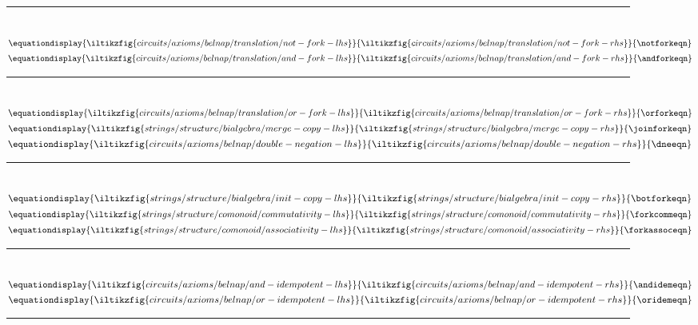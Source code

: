 \begin{figure*}
    \rule{\textwidth}{0.1mm}
    \\[0.5em]
    \(\equationdisplay{
        \iltikzfig{circuits/axioms/belnap/translation/not-fork-lhs}
    }{
        \iltikzfig{circuits/axioms/belnap/translation/not-fork-rhs}
    }{
        \notforkeqn
    }\)
    \quad
    \(\equationdisplay{
        \iltikzfig{circuits/axioms/belnap/translation/and-fork-lhs}
    }{
        \iltikzfig{circuits/axioms/belnap/translation/and-fork-rhs}
    }{
        \andforkeqn
    }\)
    \\[0.25em]
    \rule{\textwidth}{0.1mm}
    \\[0.5em]
    \(\equationdisplay{
        \iltikzfig{circuits/axioms/belnap/translation/or-fork-lhs}
    }{
        \iltikzfig{circuits/axioms/belnap/translation/or-fork-rhs}
    }{
        \orforkeqn
    }\)
    \quad
    \(\equationdisplay{
        \iltikzfig{strings/structure/bialgebra/merge-copy-lhs}
    }{
        \iltikzfig{strings/structure/bialgebra/merge-copy-rhs}
    }{
        \joinforkeqn
    }\)
    \quad
    \(\equationdisplay{
        \iltikzfig{circuits/axioms/belnap/double-negation-lhs}
    }{
        \iltikzfig{circuits/axioms/belnap/double-negation-rhs}
    }{
        \dneeqn
    }\)
    \\[0.25em]
    \rule{\textwidth}{0.1mm}
    \\[0.5em]
    \(\equationdisplay{
        \iltikzfig{strings/structure/bialgebra/init-copy-lhs}
    }{
        \iltikzfig{strings/structure/bialgebra/init-copy-rhs}
    }{
        \botforkeqn
    }\)
    \quad
    \(\equationdisplay{
        \iltikzfig{strings/structure/comonoid/commutativity-lhs}
    }{
        \iltikzfig{strings/structure/comonoid/commutativity-rhs}
    }{
        \forkcommeqn
    }\)
    \quad
    \(\equationdisplay{
        \iltikzfig{strings/structure/comonoid/associativity-lhs}
    }{
        \iltikzfig{strings/structure/comonoid/associativity-rhs}
    }{
        \forkassoceqn
    }\)
    \\[0.25em]
    \rule{\textwidth}{0.1mm}
    \\[0.5em]
    \(\equationdisplay{
        \iltikzfig{circuits/axioms/belnap/and-idempotent-lhs}
    }{
        \iltikzfig{circuits/axioms/belnap/and-idempotent-rhs}
    }{
        \andidemeqn
    }\)
    \quad
    \(\equationdisplay{
        \iltikzfig{circuits/axioms/belnap/or-idempotent-lhs}
    }{
        \iltikzfig{circuits/axioms/belnap/or-idempotent-rhs}
    }{
        \oridemeqn
    }\)
    \\[0.25em]
    \rule{\textwidth}{0.1mm}
    \\[0.5em]

\end{figure*}
